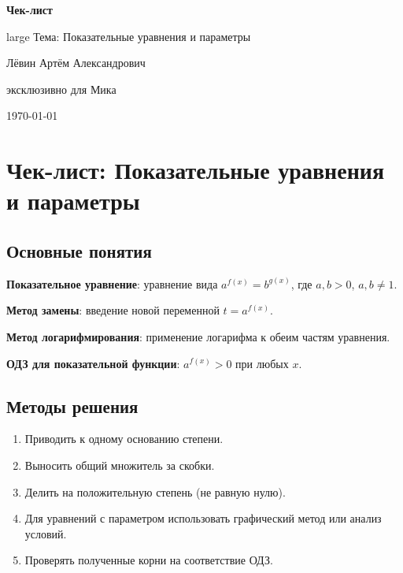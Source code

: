 \documentclass[a4paper,12pt]{article}
\begin{document}
\begin{titlepage}
\centering
\vspace*{2cm}
{\Large\bfseries\color{darkaccent} Чек-лист}\par
\vspace{0.5cm}
{{large Тема: Показательные уравнения и параметры}}\par
\vspace{2cm}
{\large Лёвин Артём Александрович}\par
{\large эксклюзивно для Мика}\par
\vspace{2cm}
{\today}\par
\vfill
{}
\vspace{1cm}
\end{titlepage}

\section*{Чек-лист: Показательные уравнения и параметры}

\subsection*{Основные понятия}
\item \textbf{Показательное уравнение}: уравнение вида $a^{f(x)} = b^{g(x)}$, где $a,b > 0$, $a,b \neq 1$.
\item \textbf{Метод замены}: введение новой переменной $t = a^{f(x)}$.
\item \textbf{Метод логарифмирования}: применение логарифма к обеим частям уравнения.
\item \textbf{ОДЗ для показательной функции}: $a^{f(x)} > 0$ при любых $x$.

\subsection*{Методы решения}
\begin{enumerate}[leftmargin=*]
\item Приводить к одному основанию степени.
\item Выносить общий множитель за скобки.
\item Делить на положительную степень (не равную нулю).
\item Для уравнений с параметром использовать графический метод или анализ условий.
\item Проверять полученные корни на соответствие ОДЗ.
\end{enumerate}
\end{document}
